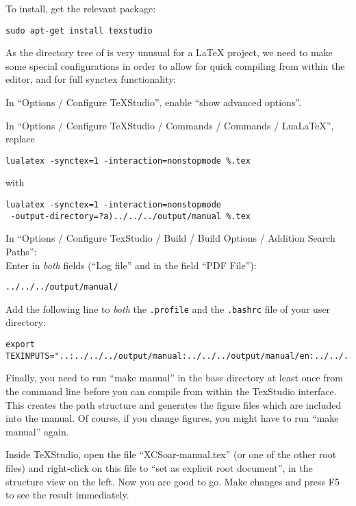 To install, get the relevant package:

\begin{verbatim}
sudo apt-get install texstudio
\end{verbatim}

As the directory tree of \xc is very unusual for a LaTeX project, we need to make some special configurations in order to allow for quick compiling from within the editor, and for full synctex functionality:

In ``Options / Configure TeXStudio'', enable ``show advanced options''.

In ``Options / Configure TeXStudio / Commands / Commands / LuaLaTeX'', replace
\begin{verbatim}
lualatex -synctex=1 -interaction=nonstopmode %.tex
\end{verbatim}
with
\begin{verbatim}
lualatex -synctex=1 -interaction=nonstopmode
 -output-directory=?a)../../../output/manual %.tex
\end{verbatim}

In ``Options / Configure TexStudio / Build / Build Options / Addition Search Paths'':\\
Enter in \emph{both} fields (``Log file'' and in the field ``PDF File''):
\begin{verbatim}
../../../output/manual/
\end{verbatim}


Add the following line to \emph{both} the \texttt{.profile} and the \texttt{.bashrc} file of your user directory:
\begin{maxipage}
\begin{verbatim}
export TEXINPUTS="..:../../../output/manual:../../../output/manual/en:../../..:"
\end{verbatim}
\end{maxipage}


Finally, you need to run ``make manual'' in the \xc base directory at least once from the command line before you can compile from within the TexStudio interface. This creates the path structure and generates the figure files which are included into the manual. Of course, if you change figures, you might have to run ``make manual'' again.

Inside TeXStudio, open the file ``XCSoar-manual.tex'' (or one of the other root files) and right-click on this file to ``set as explicit root document'', in the structure view on the left. Now you are good to go. Make changes and press F5 to see the result immediately.
